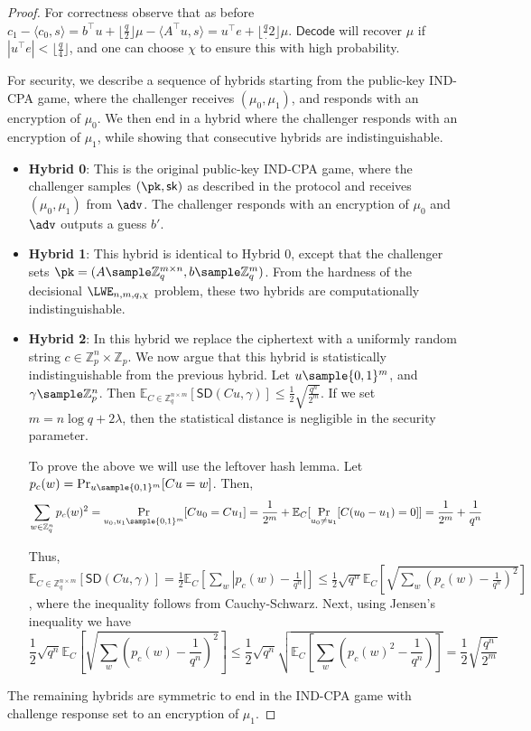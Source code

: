 \begin{proof}
    For correctness observe that as before $c_1 - \langle c_0, s\rangle = b^\intercal u + \lfloor\frac{q}{2}\rfloor\mu - \langle A^\intercal u, s\rangle = u^\intercal e + \lfloor\frac{q}.{2}\rfloor\mu$. $\mathsf{Decode}$ will recover $\mu$ if $|u^\intercal e| < \lfloor\frac{q}{4}\rfloor$, and one can choose $\chi$ to ensure this with high probability.

    For security, we describe a sequence of hybrids starting from the public-key IND-CPA game, where the challenger receives $(\mu_0, \mu_1)$, and responds with an encryption of $\mu_0$. We then end in a hybrid where the challenger responds with an encryption of $\mu_1$, while showing that consecutive hybrids are indistinguishable.

    \begin{itemize}
        \item \textbf{Hybrid 0}: This is the original public-key IND-CPA game, where the challenger samples $(\pk, \sk)$ as described in the protocol and receives $(\mu_0, \mu_1)$ from $\adv$. The challenger responds with an encryption of $\mu_0$ and $\adv$ outputs a guess $b'$.
        \item \textbf{Hybrid 1}: This hybrid is identical to Hybrid 0, except that the challenger sets $\pk = (A \sample \mathbb{Z}_q^{m \times n}, b \sample \mathbb{Z}_q^m)$. From the hardness of the decisional $\LWE_{n,m,q,\chi}$ problem, these two hybrids are computationally indistinguishable.
        \item \textbf{Hybrid 2}: In this hybrid we replace the ciphertext with a uniformly random string $c\in \mathbb{Z}_p^{n} \times \mathbb{Z}_p$. We now argue that this hybrid is statistically indistinguishable from the previous hybrid. Let $u \sample \{0,1\}^m$, and $\gamma \sample \mathbb{Z}_p^n$. Then $\mathbb{E}_{C \in \mathbb{Z}_q^{n \times m}}[\mathsf{SD}(C u, \gamma)] \leq \frac{1}{2} \sqrt{\frac{q^n}{2^m}}$. If we set $m = n \log{q} + 2\lambda$, then the statistical distance is negligible in the security parameter.

              To prove the above we will use the leftover hash lemma. Let $p_c(w) = \Pr_{u \sample \{0,1\}^m} [C u = w]$. Then,
              \[\sum_{w \in \mathbb{Z}_q^n} p_c(w)^2 = \Pr_{u_0, u_1 \sample \{0,1\}^m} [Cu_0 = Cu_1] = \frac{1}{2^m} + \mathbb{E}_C[\Pr_{u_0 \neq u_1}[C(u_0 - u_1) = 0]] = \frac{1}{2^m} + \frac{1}{q^n} \]

              Thus, $\mathbb{E}_{C \in \mathbb{Z}_q^{n \times m}}[\mathsf{SD}(C u, \gamma)] = \frac{1}{2}\mathbb{E}_{C}[\sum_w |p_c(w) - \frac{1}{q^n}|]\leq \frac{1}{2}\sqrt{q^n}\mathbb{E}_{C}\left[ \sqrt{\sum_w (p_c(w) - \frac{1}{q^n})^2} \right]$,
              where the inequality follows from Cauchy-Schwarz. Next, using Jensen's inequality we have
              \[ \frac{1}{2}\sqrt{q^n}\mathbb{E}_C\left[ \sqrt{\sum_w (p_c(w) - \frac{1}{q^n})^2}\right] \leq \frac{1}{2}\sqrt{q^n}\sqrt{\mathbb{E}_C \left[\sum_w (p_c(w)^2 - \frac{1}{q^n})\right] } = \frac{1}{2}\sqrt{\frac{q^n}{2^m}}\]
    \end{itemize}
    The remaining hybrids are symmetric to end in the IND-CPA game with challenge response set to an encryption of $\mu_1$.
\end{proof}
